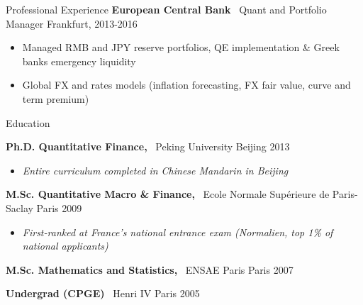 \documentclass[usegeometry, 10pt, a4paper]{cv} %
\newcommand{\activite}[1]{\textbf{#1}\ }
\begin{document}
\begin{rubriquetableau}[0.95\textwidth]{Professional Experience}
\activite{European Central Bank} Quant and Portfolio Manager \hfill Frankfurt, 2013-2016 \\
\vspace{-0.2cm}

\begin{itemize}[]
  \item Managed RMB and JPY reserve portfolios, QE implementation \& Greek banks emergency liquidity
  \item Global FX and rates models (inflation forecasting, FX fair value, curve and term premium)
\end{itemize}
\end{rubriquetableau}

\begin{rubriquetableau}[0.95\textwidth]{Education}\\
  \vspace{-0.5cm}
  
  \activite{Ph.D. Quantitative Finance,} Peking University \hfill Beijing 2013\\ 
\vspace{-0.5cm}  
  \begin{itemize}[label={},
    rightmargin=\dimexpr\linewidth-13cm-\leftmargin\relax]
  \item \small{\emph{Entire curriculum completed in Chinese Mandarin in Beijing}}
  \end{itemize}
  
  \vspace{0.2cm}
  
  \activite{M.Sc. Quantitative Macro \& Finance,} Ecole Normale Supérieure de Paris-Saclay \hfill Paris 2009\\
  \vspace{-0.5cm}
  \begin{itemize}[label={}, rightmargin=\dimexpr\linewidth-13cm-\leftmargin\relax]
  \item \small{\emph{First-ranked at France's national entrance exam (Normalien, top 1\% of national applicants)}}
  \end{itemize}

  \vspace{0.2cm}


  \activite{M.Sc. Mathematics and Statistics,} ENSAE Paris \hfill Paris 2007\\
  \vspace{0.2cm}

  \activite{Undergrad (CPGE)} Henri IV \hfill Paris 2005\\
  \end{rubriquetableau}
\end{document}
